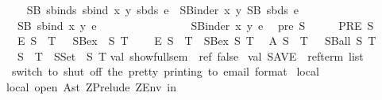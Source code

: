 \begin{isabellebody}
\isanewline
\ \isanewline
\ \ {\isachardoublequoteopen}{\isacharunderscore}SB\ {\isacharparenleft}{\isacharunderscore}sbinds\ {\isacharparenleft}{\isacharunderscore}sbind\ x\ y{\isacharparenright}\ sbds{\isacharparenright}\ e{\isachardoublequoteclose}\ {\isacharequal}{\isacharequal}\ {\isachardoublequoteopen}SBinder\ x\ {\isacharparenleft}{\isacharpercent}y{\isachardot}\ {\isacharunderscore}SB\ sbds\ e{\isacharparenright}{\isachardoublequoteclose}\isanewline
\ \ {\isachardoublequoteopen}{\isacharunderscore}SB\ {\isacharparenleft}{\isacharunderscore}sbind\ x\ y{\isacharparenright}\ e{\isachardoublequoteclose}\ \ \ \ \ \ \ \ \ \ \ \ \ \ \ \ {\isacharequal}{\isacharequal}\ {\isachardoublequoteopen}SBinder{}\ x\ {\isacharparenleft}{\isacharpercent}y{\isachardot}\ e{\isacharparenright}{\isachardoublequoteclose}\isanewline
\isanewline
\isanewline
\ \ {\isachardoublequoteopen}pre\ S{\isachardoublequoteclose}\ \ \ \ \ {\isacharless}{\isacharequal}\ {\isachardoublequoteopen}PRE\ S{\isachardoublequoteclose}\isanewline
\ \ {\isachardoublequoteopen}{\isacharpercent}E\ S\ {\isacharat}\ T{\isachardoublequoteclose}\ \ {\isacharless}{\isacharequal}\ {\isachardoublequoteopen}SBex\ \ S\ T{\isachardoublequoteclose}\ \ \isanewline
\ \ {\isachardoublequoteopen}{\isacharpercent}E{}\ S\ {\isacharat}\ T{\isachardoublequoteclose}\ {\isacharless}{\isacharequal}\ {\isachardoublequoteopen}SBex{}\ S\ T{\isachardoublequoteclose}\isanewline
\ \ {\isachardoublequoteopen}{\isacharpercent}A\ S\ {\isacharat}\ T{\isachardoublequoteclose}\ \ {\isacharless}{\isacharequal}\ {\isachardoublequoteopen}SBall\ S\ T{\isachardoublequoteclose}\ \isanewline
\ \ {\isachardoublequoteopen}{\isacharbraceleft}{\isachardot}S\ {\isacharat}\ T{\isachardot}{\isacharbraceright}{\isachardoublequoteclose}\ {\isacharless}{\isacharequal}\ {\isachardoublequoteopen}SSet\ \ S\ T{\isachardoublequoteclose}%
\isamarkuptrue%
%
\isadelimML
%
\endisadelimML
%
\isatagML
{}\isamarkupfalse%
{\isacharverbatimopen}\isanewline
val\ show{\isacharunderscore}full{\isacharunderscore}sem\ {\isacharequal}\ ref\ false{\isacharsemicolon}\ \isanewline
val\ SAVE\ {\isacharequal}\ ref{\isacharparenleft}{\isacharbrackleft}{\isacharbrackright}{\isacharcolon}term\ list{\isacharparenright}\isanewline
\isanewline
{\isacharparenleft}{\isacharasterisk}\ switch\ to\ shut\ off\ the\ pretty\ printing\ to\ email\ format\ {\isacharasterisk}{\isacharparenright}\isanewline
\isanewline
local\isanewline
\isanewline
local\ open\ Ast\ ZPrelude\ ZEnv\ in\isanewline

\end{isabellebody}
